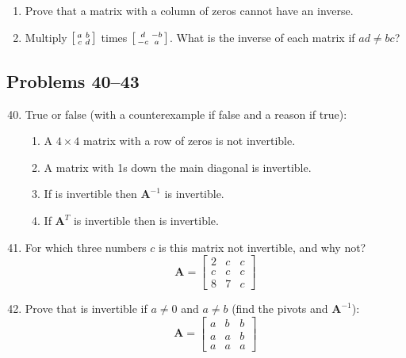 \begin{itemize}
\begin{enumerate}
      \item Prove that a matrix with a column of zeros cannot have an inverse.

      \item Multiply \( \begin{bsmallmatrix} a & b  \\ c & d
        \end{bsmallmatrix} \) times \( \begin{bsmallmatrix} d & -b \\ -c & a
        \end{bsmallmatrix} \). What is the inverse of each matrix if \(ad \neq
        bc\)?

   \end{enumerate}

    \subsection{Problems 40--43}
    \begin{enumerate}\setcounter{enumi}{39}\color{foreground-2}
      \item True or false (with a counterexample if false and a reason if true):
        \begin{enumerate}
          \item A \( 4\times 4 \) matrix with a row of zeros is not invertible.
          \item A matrix with 1s down the main diagonal is invertible.
          \item If  is invertible then \(\bm{A}^{-1}\) is invertible.
          \item If \(\bm{A}^T\) is invertible then  is invertible.
        \end{enumerate}

      \item For which three numbers \(c\) is this matrix not invertible, and why
        not?
        \[%
        \bm{A} =
        \begin{bmatrix}
        2 & c & c \\
        c & c & c \\
        8 & 7 & c
        \end{bmatrix}
        \]%

      \item Prove that  is invertible if \(a \neq 0\) and \(a \neq b\)
        (find the pivots and \(\bm{A}^{-1}\)):
        \[%
        \bm{A} =
        \begin{bmatrix}
        a & b & b \\
        a & a & b \\
        a & a & a
        \end{bmatrix}
        \]%


\end{enumerate}
\end{itemize}
